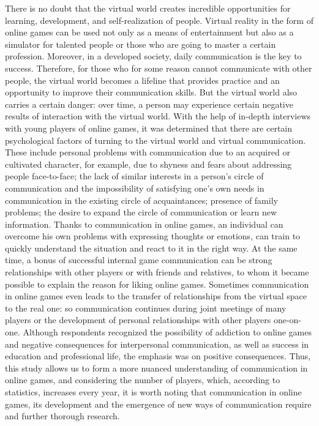 \documentclass[10pt,twoside,slovak,a4paper]{article}
\begin{document}
  There is no doubt that the virtual world creates incredible opportunities for learning, development, and self-realization of people. Virtual reality in the form of online games can be used not only as a means of entertainment but also as a simulator for talented people or those who are going to master a certain profession. Moreover, in a developed society,  daily communication is the key to success. Therefore, for those who for some reason cannot communicate with other people, the virtual world becomes a lifeline that provides practice and an opportunity to improve their communication skills. But the virtual world also carries a certain danger: over time, a person may experience certain negative results of interaction with the virtual world. With the help of in-depth interviews with young players of online games, it was determined that there are certain psychological factors of turning to the virtual world and virtual communication. These include personal problems with communication due to an acquired or cultivated character, for example, due to shyness and fears about addressing people face-to-face; the lack of similar interests in a person's circle of communication and the impossibility of satisfying one's own needs in communication in the existing circle of acquaintances; presence of family problems; the desire to expand the circle of communication or learn new information. Thanks to communication in online games, an individual can overcome his own problems with expressing thoughts or emotions, can train to quickly understand the situation and react to it in the right way. At the same time, a bonus of successful internal game communication can be strong relationships with other players or with friends and relatives, to whom it became possible to explain the reason for liking online games. Sometimes communication in online games even leads to the transfer of relationships from the virtual space to the real one: so communication continues during joint meetings of many players or the development of personal relationships with other players one-on-one. Although respondents recognized the possibility of addiction to online games and negative consequences for interpersonal communication, as well as success in education and professional life, the emphasis was on positive consequences. Thus, this study allows us to form a more nuanced understanding of communication in online games, and considering the number of players, which, according to statistics, increases every year, it is worth noting that communication in online games, its development and the emergence of new ways of communication require and further thorough research.






\end{document}

